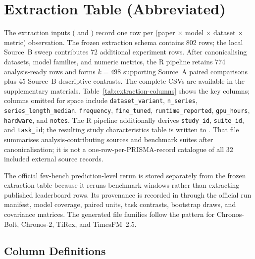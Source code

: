 \section{Extraction Table (Abbreviated)}\label{app:extraction}

The extraction inputs
( and
) record one row per
(paper $\times$ model $\times$ dataset $\times$ metric) observation.
The frozen extraction schema contains 802 rows; the local Source~B
sweep contributes 72 additional experiment rows.  After canonicalising
datasets, model families, and numeric metrics, the R pipeline retains
774 analysis-ready rows and forms $k = 498$ supporting Source~A paired
comparisons plus 45 Source~B descriptive contrasts.  The
complete CSVs are available in the supplementary materials.
Table~\ref{tab:extraction-columns} shows the key columns; columns
omitted for space include
\texttt{dataset\_variant}, \texttt{n\_series},
\texttt{series\_length\_median}, \texttt{frequency},
\texttt{fine\_tuned}, \texttt{runtime\_reported},
\texttt{gpu\_hours}, \texttt{hardware}, and \texttt{notes}.
The R pipeline additionally derives \texttt{study\_id},
\texttt{suite\_id}, and \texttt{task\_id}; the resulting study
characteristics table is written to
.  That file summarises
analysis-contributing sources and benchmark suites after canonicalisation; it
is not a one-row-per-PRISMA-record catalogue of all 32 included external
source records.

The official fev-bench prediction-level rerun is stored separately from the
frozen extraction table because it reruns benchmark windows rather than
extracting published leaderboard rows.  Its provenance is recorded in
 through the official run manifest, model coverage,
paired \WAPE{} units, task contrasts, bootstrap draws, and covariance
matrices.  The generated file families follow the
 pattern for Chronos-Bolt, Chronos-2,
TiRex, and TimesFM~2.5.

\subsection{Column Definitions}

